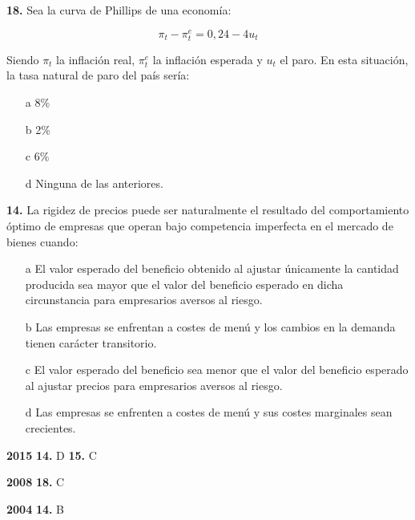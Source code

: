 \documentclass{nuevotema}
\begin{document}
\textbf{18.} Sea la curva de Phillips de una economía:

\begin{equation}
\pi_t - \pi_t^e = 0,24 - 4u_t
\end{equation}

Siendo $\pi_t$ la inflación real, $\pi_t^e$ la inflación esperada y $u_t$ el paro. En esta situación, la tasa natural de paro del país sería:

\begin{itemize}
	\item[a] 8\%
	\item[b] 2\%
	\item[c] 6\%
	\item[d] Ninguna de las anteriores.
\end{itemize}

\textbf{14.} La rigidez de precios puede ser naturalmente el resultado del comportamiento óptimo de empresas que operan bajo competencia imperfecta en el mercado de bienes cuando:

\begin{itemize}
	\item[a] El valor esperado del beneficio obtenido al ajustar únicamente la cantidad producida sea mayor que el valor del beneficio esperado en dicha circunstancia para empresarios aversos al riesgo.
	\item[b] Las empresas se enfrentan a costes de menú y los cambios en la demanda tienen carácter transitorio.
	\item[c] El valor esperado del beneficio sea menor que el valor del beneficio esperado al ajustar precios para empresarios aversos al riesgo.
	\item[d] Las empresas se enfrenten a costes de menú y sus costes marginales sean crecientes.
\end{itemize}

\notas

\textbf{2015} \textbf{14.} D \textbf{15.} C

\textbf{2008} \textbf{18.} C

\textbf{2004} \textbf{14.} B

\bibliografia
\end{document}
